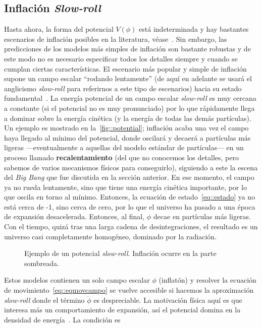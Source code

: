 \subsection{Inflación \textit{Slow-roll}}
Hasta ahora, la forma del potencial \(V(\phi)\) está indeterminada y hay bastantes escenarios de inflación posibles en la literatura, véase~\cite{liddle2000cosmological}. Sin embargo, las predicciones de los modelos más simples de inflación son bastante robustas y de este modo no es necesario especificar todos los detalles siempre y cuando se cumplan ciertas características. El escenario más popular y simple de inflación supone un campo escalar ``rodando lentamente'' (de aquí en adelante se usará el anglicismo \textit{slow-roll} para referirnos a este tipo de escenarios) hacia su estado fundamental~\cite{linde1982new,albrecht1982cosmology}. La energía potencial de un campo escalar \textit{slow-roll} es muy cercana a constante (si el potencial no es muy pronunciado) por lo que rápidamente llega a dominar sobre la energía cinética (y la energía de todas las demás partículas). Un ejemplo es mostrado en la~\autoref{fig::potential}; inflación acaba una vez el campo haya llegado al mínimo del potencial, donde oscilará y decaerá a partículas más ligeras ---eventualmente a aquellas del modelo estándar de partículas--- en un proceso llamado \textbf{recalentamiento} (del que no conocemos los detalles, pero sabemos de varios mecanismos físicos para conseguirlo), siguiendo a este la escena del \textit{Big Bang} que fue discutida en la sección anterior. En ese momento, el campo ya no rueda lentamente, sino que tiene una energía cinética importante, por lo que oscila en torno al mínimo. Entonces, la ecuación de estado~\ref{eq::estado} ya no está cerca de -1, sino cerca de cero, por lo que el universo ha pasado a una época de expansión desacelerada. Entonces, al final, \(\phi\) decae en partículas más ligeras. Con el tiempo, quizá tras una larga cadena de desintegraciones, el resultado es un universo casi completamente homogéneo, dominado por la radiación.
\begin{figure}[t]
    \centering
    \def\svgwidth{0.65\textwidth}
    
    \caption[Ejemplo de un potencial \textit{slow-roll}]{Ejemplo de un potencial \textit{slow-roll}. Inflación ocurre en la parte sombreada.}
    \label{fig::potential}
\end{figure}
\newpage
Estos modelos contienen un solo campo escalar \(\phi\) (inflatón) y resolver la ecuación de movimiento~\ref{eq::eqmovcampo} se vuelve accesible si hacemos la aproximación \textit{slow-roll} donde el término \(\ddot{\phi}\) es despreciable. La motivación física aquí es que interesa más un comportamiento de expansión, así el potencial domina en la densidad de energía~\cite{peacock1998cosmological}. La condición es
